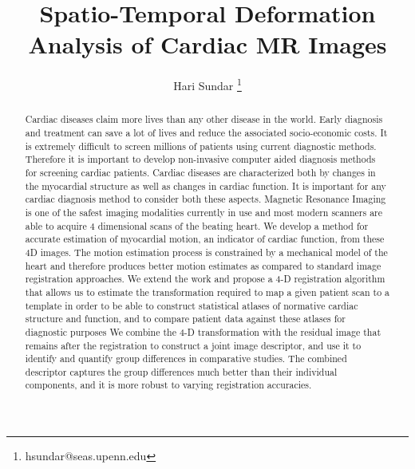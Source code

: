 \documentclass[12pt,twoside,onecolumn]{IEEEtran}
\begin{document}
\title{Spatio-Temporal Deformation Analysis of Cardiac MR Images}
\author{Hari Sundar \thanks{hsundar@seas.upenn.edu}}


\maketitle

\begin{abstract}

Cardiac diseases claim more lives than any other disease in the world. Early diagnosis and treatment can save a lot of lives and reduce the associated socio-economic costs. It is extremely difficult to screen millions of patients using current diagnostic methods. Therefore it is important to develop non-invasive computer aided diagnosis methods for screening cardiac patients. Cardiac diseases are characterized both by changes in the myocardial structure as well as changes in cardiac function. It is important for any cardiac diagnosis method to consider both these aspects. Magnetic Resonance Imaging is one of the safest imaging modalities currently in use and most modern scanners are able to acquire 4 dimensional scans of the beating heart. We develop a method for accurate estimation of myocardial motion, an indicator of cardiac function, from these 4D images. The motion estimation process is constrained by a mechanical model of the heart and therefore produces better motion estimates as compared to standard image registration approaches. We extend the work and propose a 4-D registration algorithm that allows us to estimate the transformation required to map a given patient scan to a template in order to be able to construct statistical atlases of normative cardiac structure and function, and to compare patient data against these atlases for diagnostic purposes 
We combine the 4-D transformation with the residual image that remains after the registration to construct a joint image descriptor, and use it to identify and quantify group differences in comparative studies. The combined descriptor captures the group differences much better than their individual components, and it is more robust to varying registration accuracies.

\end{abstract}
\end{document}
